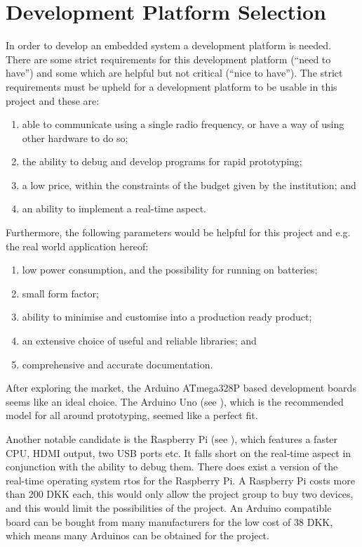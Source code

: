 
\section{Development Platform Selection}
In order to develop an embedded system a development platform is needed. 
There are some strict requirements for this development platform (``need to have'') and some which are helpful but not critical (``nice to have'').
The strict requirements must be upheld for a development platform to be usable in this project and these are:

\begin{enumerate}[label=\itshape \alph*\upshape)]
\item able to communicate using a single radio frequency, or have a way of using other hardware to do so;
\item the ability to debug and develop programs for rapid prototyping;
\item a low price, within the constraints of the budget given by the institution;
and
\item an ability to implement a real-time aspect.
\end{enumerate}

\noindent
Furthermore, the following parameters would be helpful for this project and e.g. the real world application hereof:

\begin{enumerate}[label=\itshape \alph*\upshape), resume]
\item low power consumption, and the possibility for running on batteries;
\item small form factor;
\item ability to minimise and customise into a production ready product;
\item an extensive choice of useful and reliable libraries;
and
\item comprehensive and accurate documentation.
\end{enumerate}

\bigskip
\noindent
After exploring the market, the Arduino ATmega328P based development boards seems like an ideal choice.
The Arduino Uno (see \cite{ArduinoUNO}), which is the recommended model for all around prototyping, seemed like a perfect fit.

Another notable candidate is the Raspberry Pi (see \cite{RaspberryPI}), which features a  faster CPU, HDMI output, two USB ports etc.
It falls short on the real-time aspect in conjunction with the ability to debug them. 
There does exist a version of the real-time operating system \gls{rtos} for the Raspberry Pi.
A Raspberry Pi costs more than 200 DKK each, this would only allow the project group to buy two devices, and this would limit the possibilities of the project.
An Arduino compatible board can be bought from many manufacturers for the low cost of 38 DKK, which means many Arduinos can be obtained for the project.

